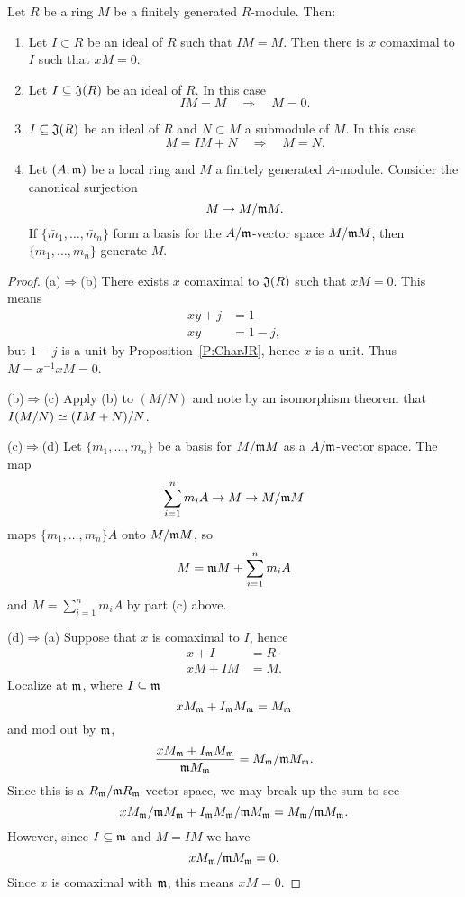 \documentclass{ximera}
\begin{document}
\begin{theorem}\label{NAK}
  Let $R$ be a ring $M$ be a finitely generated $R$-module. Then:
  \begin{enumerate}
    \item Let $I\subset R$ be an ideal of $R$ such that $IM = M$. Then
      there is $x$ comaximal to $I$ such that $xM = 0$.
    \item Let $I\subseteq \mathfrak J(R)$ be an ideal of $R$. In this case
      \[
      IM = M \quad\Rightarrow\quad M = 0.
      \]
    \item $I\subseteq \mathfrak J(R)$ be an ideal of $R$ and $N\subset M$ a
      submodule of $M$. In this case
      \[
      M = IM + N \quad \Rightarrow \quad M = N.
      \]
    \item Let $(A,\mathfrak{m})$ be a local ring and $M$ a finitely generated
      $A$-module. Consider the canonical surjection
      \[
      M \to  M/\mathfrak{m} M.
      \]
      If $\{\bar{m}_1,\dots, \bar{m}_n\}$ form a basis for the $A/\mathfrak{m}$-vector
      space $M/\mathfrak{m} M$, then $\{m_1,\dots, m_n\}$ generate $M$.
  \end{enumerate}
  \begin{proof} 
    (a)$\Rightarrow$(b) There exists $x$ comaximal to $\mathfrak J(R)$ such
    that $xM = 0$. This means
    \begin{align*}
      xy + j &= 1\\
      xy &= 1-j,
    \end{align*}
    but $1-j$ is a unit by Proposition~\ref{P:CharJR}, hence $x$ is a
    unit. Thus $M = x^{-1}x M = 0$.

    
    (b)$\Rightarrow$(c) Apply (b) to $(M/N)$ and note by an
    isomorphism theorem that $I(M/N)\simeq (IM + N)/N$.

    
    (c)$\Rightarrow$(d) Let $\{\bar{m}_1,\dots,\bar{m}_n\}$ be a basis
    for $M/\mathfrak{m} M$ as a $A/\mathfrak{m}$-vector space. The map
    \[
    \sum_{i=1}^n m_iA \to M \to M/\mathfrak{m} M
    \]
    maps $\{m_1,\dots, m_n\}A$ onto $M/\mathfrak{m} M$, so
    \[
    M = \mathfrak{m} M + \sum_{i=1}^n m_iA 
    \]
    and $M = \sum_{i=1}^n m_iA$ by part (c) above.

    
    (d)$\Rightarrow$(a) Suppose that $x$ is comaximal to $I$, hence
    \begin{align*}
      x + I &= R\\
      xM + IM &= M.
    \end{align*}
    Localize at $\mathfrak{m}$, where $I\subseteq\mathfrak{m}$
    \[
    xM_{\mathfrak{m}} + I_{\mathfrak{m}} M_{\mathfrak{m}} = M_{\mathfrak{m}}
    \]
    and mod out by $\mathfrak{m}$,
    \[
    \frac{xM_{\mathfrak{m}} + I_{\mathfrak{m}} M_{\mathfrak{m}}}{\mathfrak{m} M_{\mathfrak{m}}} = M_{\mathfrak{m}}/\mathfrak{m} M_{\mathfrak{m}}.
    \]
    Since this is a $R_{\mathfrak{m}}/\mathfrak{m} R_{\mathfrak{m}}$-vector space, we may break up the
    sum to see
    \[
    xM_{\mathfrak{m}}/\mathfrak{m} M_{\mathfrak{m}} + I_{\mathfrak{m}} M_{\mathfrak{m}}/\mathfrak{m} M_{\mathfrak{m}} = M_{\mathfrak{m}}/\mathfrak{m} M_{\mathfrak{m}}.
    \]
    However, since $I\subseteq\mathfrak{m}$ and $M = IM$ we have
    \[
    xM_{\mathfrak{m}}/\mathfrak{m} M_{\mathfrak{m}} =0.
    \]
    Since $x$ is comaximal with $\mathfrak{m}$, this means $xM = 0$.
  \end{proof}
\end{theorem}
\end{document}
